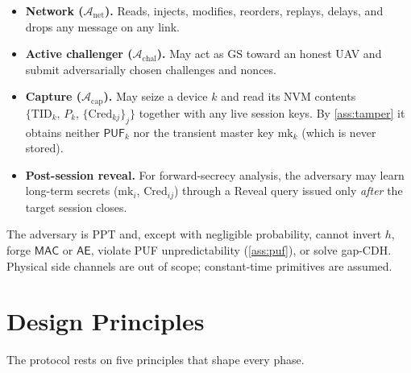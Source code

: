 \documentclass[11pt,a4paper]{article}
\theoremstyle{jrnlplain}
\theoremstyle{jrnldef}
\newcommand{\GS}{\mathrm{GS}}
\newcommand{\PUF}{\mathsf{PUF}}
\newcommand{\TID}{\mathrm{TID}}
\newcommand{\Cred}{\mathrm{Cred}}
\newcommand{\mk}{\mathrm{mk}}
\newcommand{\MAC}{\mathsf{MAC}}
\newcommand{\aead}{\mathsf{AE}}
\newcommand{\adv}{\mathcal{A}}
\begin{document}
\begin{itemize}[leftmargin=1.5em]
\item \textbf{Network ($\adv_{\mathrm{net}}$).} Reads, injects, modifies,
reorders, replays, delays, and drops any message on any link.
\item \textbf{Active challenger ($\adv_{\mathrm{chal}}$).} May act as $\GS$
toward an honest UAV and submit adversarially chosen challenges and nonces.
\item \textbf{Capture ($\adv_{\mathrm{cap}}$).} May seize a device $k$ and
read its NVM contents $\{\TID_k,\,P_k,\,\{\Cred_{kj}\}_j\}$ together with any
live session keys. By \cref{ass:tamper} it obtains neither $\PUF_k$ nor the
transient master key $\mk_k$ (which is never stored).
\item \textbf{Post-session reveal.} For forward-secrecy analysis, the
adversary may learn long-term secrets ($\mk_i$, $\Cred_{ij}$) through a
\textsf{Reveal} query issued only \emph{after} the target session closes.
\end{itemize}

The adversary is PPT and, except with negligible probability, cannot invert
$h$, forge $\MAC$ or $\aead$, violate PUF unpredictability
(\cref{ass:puf}), or solve gap-CDH. Physical side channels are out of scope;
constant-time primitives are assumed.

\section{Design Principles}
\label{sec:design}
The protocol rests on five principles that shape every phase.
\end{document}

